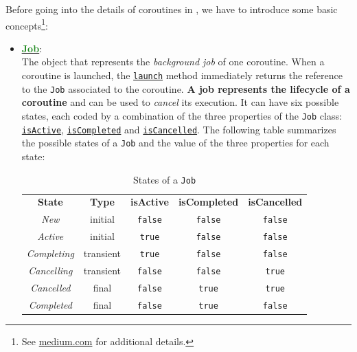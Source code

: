 Before going into the details of coroutines in \Kotlin, we have to introduce some basic concepts\footnote{See \href{https://medium.com/mobile-app-development-publication/kotlin-coroutine-scope-context-and-job-made-simple-5adf89fcfe94}{medium.com} for additional details.}:
\begin{itemize}
	\item \href{https://kotlinlang.org/api/kotlinx.coroutines/kotlinx-coroutines-core/kotlinx.coroutines/-job/}{\underline{\textbf{\textcolor{ForestGreen}{Job}}}}:\\
	The object that represents the \textit{background job} of one coroutine. When a coroutine is launched, the \href{https://kotlinlang.org/api/kotlinx.coroutines/kotlinx-coroutines-core/kotlinx.coroutines/launch.html}{\texttt{launch}} method immediately returns the reference to the \texttt{Job} associated to the coroutine. \textbf{A job represents the lifecycle of a coroutine} and can be used to \textit{cancel} its execution. It can have six possible states, each coded by a combination of the three properties of the \texttt{Job} class: \href{https://kotlinlang.org/api/kotlinx.coroutines/kotlinx-coroutines-core/kotlinx.coroutines/-job/is-active.html}{\texttt{isActive}}, \href{https://kotlinlang.org/api/kotlinx.coroutines/kotlinx-coroutines-core/kotlinx.coroutines/-job/is-completed.html}{\texttt{isCompleted}} and \href{https://kotlinlang.org/api/kotlinx.coroutines/kotlinx-coroutines-core/kotlinx.coroutines/-job/is-cancelled.html}{\texttt{isCancelled}}.
	The following table summarizes the possible states of a \texttt{Job} and the value of the three properties for each state:
	\begin{table}[h!]
		\centering
		\begin{tabular}{ccccc}
			\textbf{State} & \textbf{Type} & \textbf{isActive} & \textbf{isCompleted} & \textbf{isCancelled} \\
			\textit{New}        & initial   & \texttt{false} & \texttt{false} & \texttt{false} \\
			\textit{Active}     & initial   & \texttt{true}  & \texttt{false} & \texttt{false} \\
			\textit{Completing} & transient & \texttt{true}  & \texttt{false} & \texttt{false} \\
			\textit{Cancelling} & transient & \texttt{false} & \texttt{false} & \texttt{true}  \\
			\textit{Cancelled}  & final     & \texttt{false} & \texttt{true}  & \texttt{true}  \\
			\textit{Completed}  & final     & \texttt{false} & \texttt{true}  & \texttt{false}
		\end{tabular}
		\caption{States of a \texttt{Job}}
		\label{tab:job_states}
	\end{table}


\end{itemize}
